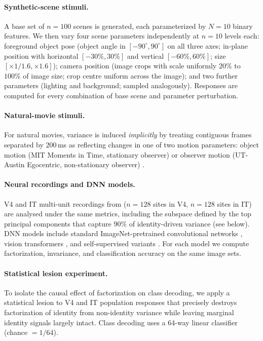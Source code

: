 \documentclass[11pt]{article}
\begin{document}
\paragraph{Synthetic-scene stimuli.} A base set of $n = 100$ scenes is generated, each parameterized by $N = 10$ binary features. We then vary four scene parameters independently at $n = 10$ levels each: foreground object pose (object angle in $[-90^\circ, 90^\circ]$ on all three axes; in-plane position with horizontal $[-30\%, 30\%]$ and vertical $[-60\%, 60\%]$; size $[\times 1/1.6, \times 1.6]$); camera position (image crops with scale uniformly $20\%$ to $100\%$ of image size; crop centre uniform across the image); and two further parameters (lighting and background; sampled analogously). Responses are computed for every combination of base scene and parameter perturbation.

\paragraph{Natural-movie stimuli.} For natural movies, variance is induced \emph{implicitly} by treating contiguous frames separated by $200$\,ms as reflecting changes in one of two motion parameters: object motion (MIT Moments in Time, stationary observer) or observer motion (UT-Austin Egocentric, non-stationary observer) \cite{mit_moments2020,utaustin_egocentric}.

\paragraph{Neural recordings and DNN models.} V4 and IT multi-unit recordings from \cite{majaj2015simple} ($n=128$ sites in V4, $n=128$ sites in IT) are analysed under the same metrics, including the subspace defined by the top principal components that capture $90\%$ of identity-driven variance (see below). DNN models include standard ImageNet-pretrained convolutional networks \cite{he2016resnet,krizhevsky2012alexnet}, vision transformers \cite{dosovitskiy2021vit}, and self-supervised variants \cite{chen2020simclr,caron2021dino}. For each model we compute factorization, invariance, and classification accuracy on the same image sets.

\paragraph{Statistical lesion experiment.} To isolate the causal effect of factorization on class decoding, we apply a statistical lesion to V4 and IT population responses that precisely destroys factorization of identity from non-identity variance while leaving marginal identity signals largely intact. Class decoding uses a 64-way linear classifier (chance $= 1/64$).
\end{document}
